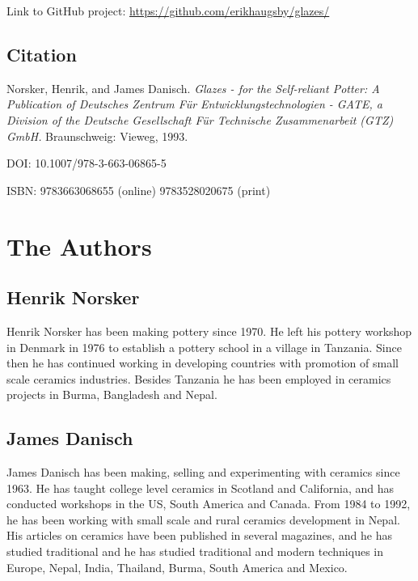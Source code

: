Link to GitHub project: 
\href{https://github.com/erikhaugsby/glazes/}{https://github.com/erikhaugsby/glazes/}
\subsection*{Citation}

Norsker, Henrik, and James Danisch. \textit{Glazes - for the Self-reliant 
  Potter: A Publication of Deutsches Zentrum F\"{u}r Entwicklungstechnologien - 
  GATE, a Division of the Deutsche Gesellschaft F\"{u}r Technische 
  Zusammenarbeit 
  (GTZ) GmbH.} Braunschweig: Vieweg, 1993.

DOI: 10.1007/978-3-663-06865-5

ISBN: 9783663068655 (online) 9783528020675 (print)
\newpage
\section*{The Authors}
\subsection*{Henrik Norsker} 
Henrik Norsker has been making pottery since 1970. He left his 
pottery workshop in Denmark in 1976 to establish a pottery school in a village 
in Tanzania. Since then he has continued working in developing countries with 
promotion of small scale ceramics industries. Besides Tanzania he has been 
employed in ceramics projects in Burma, Bangladesh and Nepal.
\subsection*{James Danisch} 
James Danisch has been making, selling and experimenting with 
ceramics since 1963. He has taught college level ceramics in Scotland and 
California, and has conducted workshops in the US, South America and Canada. 
From 1984 to 1992, he has been working with small scale and rural ceramics 
development in Nepal. His articles on ceramics have been published in several 
magazines, and he has studied traditional and he has studied traditional and 
modern techniques in Europe, Nepal, India, Thailand, Burma, South America and 
Mexico.
